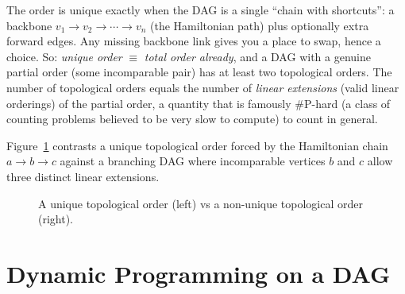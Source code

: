 \begin{intuitionbox}
The order is unique exactly when the DAG is a single ``chain with shortcuts'': a backbone
$v_1\to v_2\to\cdots\to v_n$ (the Hamiltonian path) plus optionally extra forward edges. Any missing
backbone link gives you a place to swap, hence a choice. So: \emph{unique order} $\equiv$ \emph{total
order already}, and a DAG with a genuine partial order (some incomparable pair) has at least two
topological orders. The number of topological orders equals the number of \emph{linear extensions} (valid linear orderings) of
the partial order, a quantity that is famously $\#\mathrm{P}$-hard (a class of counting problems believed to be very slow to compute) to count in general.
\end{intuitionbox}

Figure~\ref{fig:ch04-uniqueness} contrasts a unique topological order forced by the Hamiltonian chain $a\to b\to c$ against a branching DAG where incomparable vertices $b$ and $c$ allow three distinct linear extensions.

\begin{figure}[htbp]
\centering
{}
\caption{A unique topological order (left) vs a non-unique topological order (right).}
\label{fig:ch04-uniqueness}
\end{figure}

\section{Dynamic Programming on a DAG}

